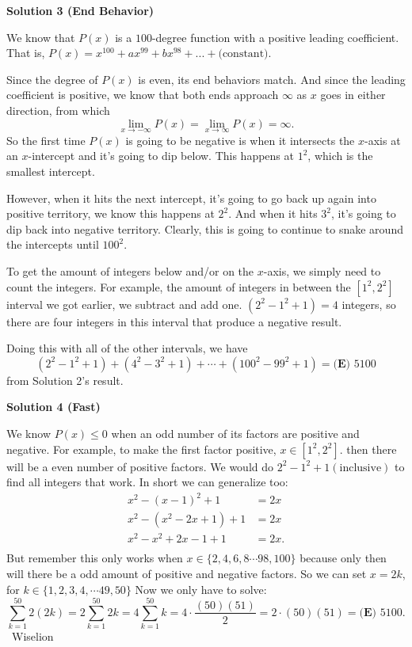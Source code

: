 \begin{enumerate}
 



\textbf{Solution 3 (End Behavior)}

We know that $P(x)$ is a $100$-degree function with a positive leading coefficient. That is, $P(x)=x^{100}+ax^{99}+bx^{98}+...+\text{(constant)}$.

 Since the degree of $P(x)$ is even, its end behaviors match. And since the leading coefficient is positive, we know that both ends approach $\infty$ as $x$ goes in either direction, from which 
 \[\lim_{x\to-\infty} P(x)=\lim_{x\to\infty} P(x)=\infty.\] So the first time $P(x)$ is going to be negative is when it intersects the $x$-axis at an $x$-intercept and it's going to dip below. This happens at $1^2$, which is the smallest intercept.

 However, when it hits the next intercept, it's going to go back up again into positive territory, we know this happens at $2^2$. And when it hits $3^2$, it's going to dip back into negative territory. Clearly, this is going to continue to snake around the intercepts until $100^2$.

 To get the amount of integers below and/or on the $x$-axis, we simply need to count the integers. For example, the amount of integers in between the $[1^2,2^2]$ interval we got earlier, we subtract and add one. $(2^2-1^2+1)=4$ integers, so there are four integers in this interval that produce a negative result. 

 Doing this with all of the other intervals, we have 
 \[(2^2-1^2+1)+(4^2-3^2+1)+\cdots+(100^2-99^2+1)=\boxed{\textbf{(E) } 5100}\] from Solution 2's result.

 



\textbf{Solution 4 (Fast)}

We know $P(x) \leq 0$ when an odd number of its factors are positive and negative. For example, to make the first factor positive, $x \in [1^2, 2^2]$. then there will be a even number of positive factors. We would do $2^2 - 1^2 + 1 (\text{inclusive})$ to find all integers that work. In short we can generalize too:
 \begin{align*} x^2 - (x-1)^2 + 1 &= 2x \\ x^2 - (x^2 - 2x + 1) + 1 &= 2x \\ x^2 - x^2 + 2x - 1 + 1 &= 2x. \\ \end{align*}
But remember this only works when $x \in \{2, 4, 6, 8 \cdots 98, 100\}$ because only then will there be a odd amount of positive and negative factors. So we can set $x = 2k$, for $k \in \{1, 2, 3, 4, \cdots 49, 50\}$ Now we only have to solve:
 \[\sum_{k=1}^{50}2(2k) = 2\sum_{k = 1}^{50}2k = 4\sum_{k = 1}^{50}k = 4 \cdot \dfrac{(50)(51)}{2} = 2 \cdot (50)(51) = \boxed{\textbf{(E) } 5100}.\]~Wiselion


\end{enumerate}

